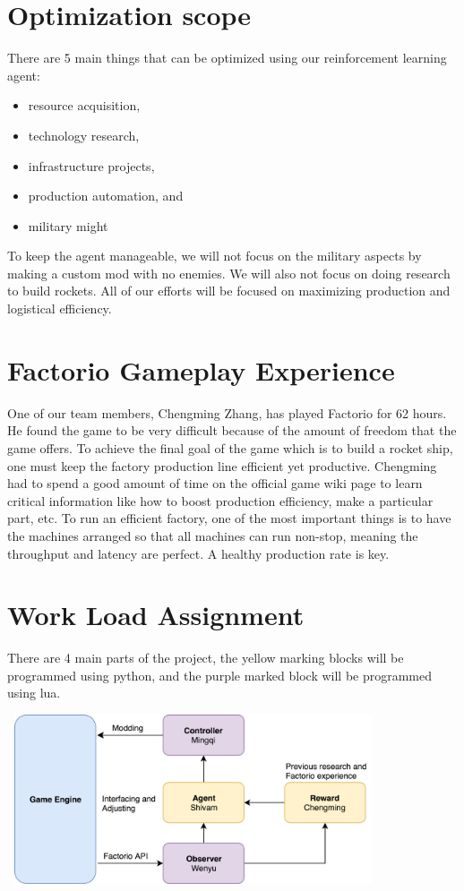 \documentclass{article}
\begin{document}
\section{Optimization scope}


There are 5 main things that can be optimized using our reinforcement learning agent: 
\begin{itemize}
    \item resource acquisition,
    \item technology research,
    \item infrastructure projects,
    \item production automation, and
    \item military might
\end{itemize}
To keep the agent manageable, we will not focus on the military aspects by making a custom mod with no enemies. We will also not focus on doing research to build rockets. All of our efforts will be focused on maximizing production and logistical efficiency.


\section{Factorio Gameplay Experience}
One of our team members, Chengming Zhang, has played Factorio for 62 hours. He found the game to be very difficult because of the amount of freedom that the game offers. To achieve the final goal of the game which is to build a rocket ship, one must keep the factory production line efficient yet productive. Chengming had to spend a good amount of time on the official game wiki page to learn critical information like how to boost production efficiency, make a particular part, etc. To run an efficient factory, one of the most important things is to have the machines arranged so that all machines can run non-stop, meaning the throughput and latency are perfect. A healthy production rate is key.

\section{Work Load Assignment}
There are 4 main parts of the project, the yellow marking blocks will be programmed using python, and the purple marked block will be programmed using lua. 

\begin{center}
  \includegraphics[width=11cm, height=5cm]{download.png}
\end{center}
\end{document}
